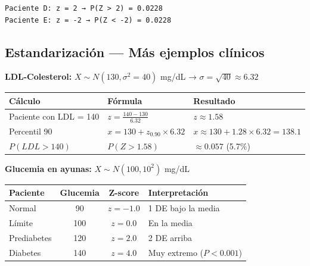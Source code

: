 \documentclass[
  letterpaper,
  DIV=11,
  numbers=noendperiod]{scrartcl}
\newcounter{none} %
\begin{document}
\begin{verbatim}
Paciente D: z = 2 → P(Z > 2) = 0.0228 
Paciente E: z = -2 → P(Z < -2) = 0.0228
\end{verbatim}

\subsection{Estandarización --- Más ejemplos
clínicos}\label{estandarizacion-mas-ejemplos-clinicos}

\textbf{LDL-Colesterol:} \(X \sim N(130, \sigma^2=40)\) mg/dL →
\(\sigma = \sqrt{40} \approx 6.32\)

{\def\LTcaptype{none} %
\begin{longtable}[]{@{}
  >{\raggedright\arraybackslash}p{}
  >{\raggedright\arraybackslash}p{}
  >{\raggedright\arraybackslash}p{}@{}}
\toprule\noalign{}
\begin{minipage}[b]{\linewidth}\raggedright
Cálculo
\end{minipage} & \begin{minipage}[b]{\linewidth}\raggedright
Fórmula
\end{minipage} & \begin{minipage}[b]{\linewidth}\raggedright
Resultado
\end{minipage} \\
\midrule\noalign{}
\endhead
\bottomrule\noalign{}
\endlastfoot
Paciente con LDL = 140 & \(z = \frac{140-130}{6.32}\) &
\(z \approx 1.58\) \\
Percentil 90 & \(x = 130 + z_{0.90} \times 6.32\) &
\(x \approx 130 + 1.28 \times 6.32 = 138.1\) \\
\(P(LDL > 140)\) & \(P(Z > 1.58)\) & \(\approx 0.057\) (5.7\%) \\
\end{longtable}
}

\textbf{Glucemia en ayunas:} \(X \sim N(100, 10^2)\) mg/dL

{\def\LTcaptype{none} %
\begin{longtable}[]{@{}lccl@{}}
\toprule\noalign{}
Paciente & Glucemia & Z-score & Interpretación \\
\midrule\noalign{}
\endhead
\bottomrule\noalign{}
\endlastfoot
Normal & 90 & \(z = -1.0\) & 1 DE bajo la media \\
Límite & 100 & \(z = 0.0\) & En la media \\
Prediabetes & 120 & \(z = 2.0\) & 2 DE arriba \\
Diabetes & 140 & \(z = 4.0\) & Muy extremo (\(P < 0.001\)) \\
\end{longtable}
}
\end{document}
